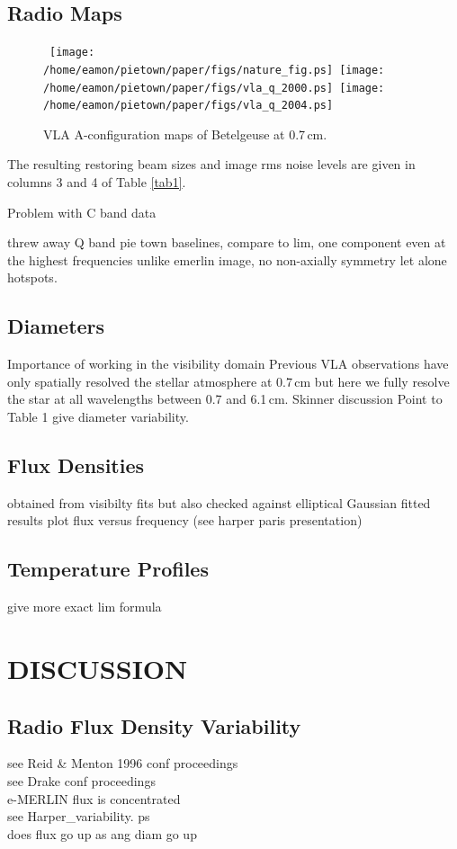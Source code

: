 \documentclass[iop]{emulateapj}
\begin{document}
\subsection{Radio Maps} 
\begin{figure*}
\mbox{
\texttt{[image: /home/eamon/pietown/paper/figs/nature\_fig.ps]}
\texttt{[image: /home/eamon/pietown/paper/figs/vla\_q\_2000.ps]}
\texttt{[image: /home/eamon/pietown/paper/figs/vla\_q\_2004.ps]}
}
\caption{VLA A-configuration maps of Betelgeuse at 0.7\,cm. }
\label{fig:fig5}
\end{figure*}
The resulting restoring beam sizes and image rms noise levels are given in columns 3 and 4 of Table \ref{tab1}.

Problem with C band data

threw away Q band pie town baselines, compare to lim, one component even at the highest frequencies unlike emerlin image, no non-axially symmetry let alone hotspots.
\subsection{Diameters} 
Importance of working in the visibility domain
Previous VLA observations have only spatially resolved the stellar atmosphere at 0.7\,cm but here we fully resolve the star at all wavelengths between 0.7 and 6.1\,cm. Skinner discussion
Point to Table 1 give diameter variability.
\subsection{Flux Densities}
obtained from visibilty fits but also checked against elliptical Gaussian fitted results
plot flux versus frequency (see harper paris presentation)
\subsection{Temperature Profiles}
give more exact lim formula 

\section{DISCUSSION}
\subsection{Radio Flux Density Variability} 
see Reid \& Menton 1996 conf proceedings\\
see Drake conf proceedings\\
e-MERLIN flux is concentrated\\
see Harper\_variability. ps\\
does flux go up as ang diam go up
\end{document}
